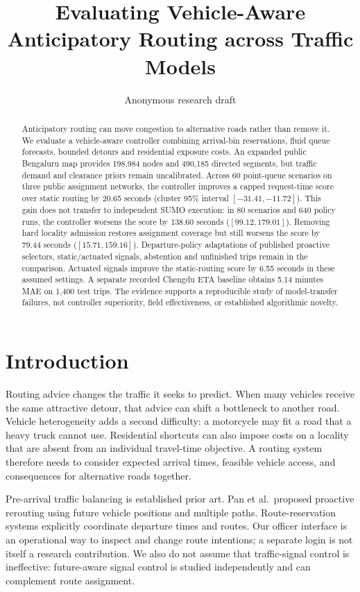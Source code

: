 \documentclass[sigconf,anonymous,review]{acmart}
\title{Evaluating Vehicle-Aware Anticipatory Routing across Traffic Models}
\author{Anonymous research draft}
\begin{document}
\begin{abstract}
Anticipatory routing can move congestion to alternative roads rather than remove it. We evaluate a vehicle-aware controller combining arrival-bin reservations, fluid queue forecasts, bounded detours and residential exposure costs. An expanded public Bengaluru map provides 198,984 nodes and 490,185 directed segments, but traffic demand and clearance priors remain uncalibrated. Across 60 point-queue scenarios on three public assignment networks, the controller improves a capped request-time score over static routing by 20.65 seconds (cluster 95\% interval $[-31.41,-11.72]$). This gain does not transfer to independent SUMO execution: in 80 scenarios and 640 policy runs, the controller worsens the score by 138.60 seconds ($[99.12,179.01]$). Removing hard locality admission restores assignment coverage but still worsens the score by 79.44 seconds ($[15.71,159.16]$). Departure-policy adaptations of published proactive selectors, static/actuated signals, abstention and unfinished trips remain in the comparison. Actuated signals improve the static-routing score by 6.55 seconds in these assumed settings. A separate recorded Chengdu ETA baseline obtains 5.14 minutes MAE on 1,400 test trips. The evidence supports a reproducible study of model-transfer failures, not controller superiority, field effectiveness, or established algorithmic novelty.
\end{abstract}
\maketitle

\section{Introduction}
Routing advice changes the traffic it seeks to predict. When many vehicles receive the same attractive detour, that advice can shift a bottleneck to another road. Vehicle heterogeneity adds a second difficulty: a motorcycle may fit a road that a heavy truck cannot use. Residential shortcuts can also impose costs on a locality that are absent from an individual travel-time objective. A routing system therefore needs to consider expected arrival times, feasible vehicle access, and consequences for alternative roads together.

Pre-arrival traffic balancing is established prior art. Pan et al.\ proposed proactive rerouting using future vehicle positions and multiple paths\cite{pan2012}. Route-reservation systems explicitly coordinate departure times and routes\cite{reservation2018}. Our officer interface is an operational way to inspect and change route intentions; a separate login is not itself a research contribution. We also do not assume that traffic-signal control is ineffective: future-aware signal control is studied independently\cite{futurelight2026} and can complement route assignment.
\end{document}
